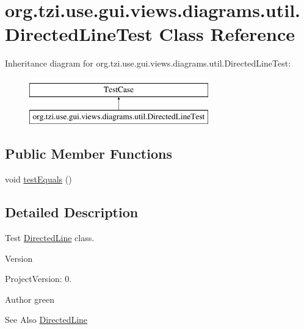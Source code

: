 \hypertarget{classorg_1_1tzi_1_1use_1_1gui_1_1views_1_1diagrams_1_1util_1_1_directed_line_test}{\section{org.\-tzi.\-use.\-gui.\-views.\-diagrams.\-util.\-Directed\-Line\-Test Class Reference}
\label{classorg_1_1tzi_1_1use_1_1gui_1_1views_1_1diagrams_1_1util_1_1_directed_line_test}
}
Inheritance diagram for org.\-tzi.\-use.\-gui.\-views.\-diagrams.\-util.\-Directed\-Line\-Test\-:\begin{figure}[H]
\begin{center}
\leavevmode
\includegraphics[height=2.000000cm]{classorg_1_1tzi_1_1use_1_1gui_1_1views_1_1diagrams_1_1util_1_1_directed_line_test}
\end{center}
\end{figure}
\subsection*{Public Member Functions}
\begin{DoxyCompactItemize}
\item 
void \hyperlink{classorg_1_1tzi_1_1use_1_1gui_1_1views_1_1diagrams_1_1util_1_1_directed_line_test_a13f3819dac35d4631ecf3650636c4ab5}{test\-Equals} ()
\end{DoxyCompactItemize}


\subsection{Detailed Description}
Test \hyperlink{classorg_1_1tzi_1_1use_1_1gui_1_1views_1_1diagrams_1_1util_1_1_directed_line}{Directed\-Line} class.

\begin{DoxyVersion}{Version}

\end{DoxyVersion}
\begin{DoxyParagraph}{Project\-Version\-:}
0. 
\end{DoxyParagraph}
\begin{DoxyAuthor}{Author}
green 
\end{DoxyAuthor}
\begin{DoxySeeAlso}{See Also}
\hyperlink{classorg_1_1tzi_1_1use_1_1gui_1_1views_1_1diagrams_1_1util_1_1_directed_line}{Directed\-Line} 
\end{DoxySeeAlso}


